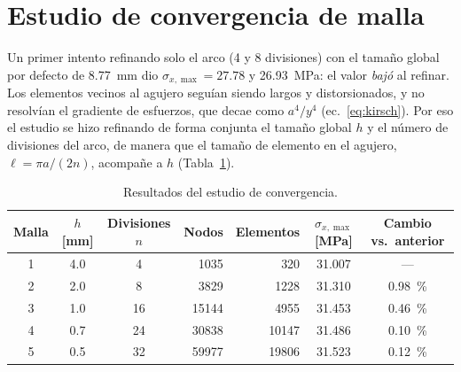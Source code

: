 \documentclass[11pt,letterpaper]{article}
\begin{document}
\section{Estudio de convergencia de malla}
Un primer intento refinando solo el arco (4 y 8 divisiones) con el tamaño global por defecto de \SI{8.77}{mm} dio $\sigma_{x,\max}=27.78$ y \SI{26.93}{MPa}: el valor \emph{bajó} al refinar. Los elementos vecinos al agujero seguían siendo largos y distorsionados, y no resolvían el gradiente de esfuerzos, que decae como $a^4/y^4$ (ec.~\ref{eq:kirsch}). Por eso el estudio se hizo refinando de forma conjunta el tamaño global $h$ y el número de divisiones del arco, de manera que el tamaño de elemento en el agujero, $\ell=\pi a/(2n)$, acompañe a $h$ (Tabla~\ref{tab:conv}).

\begin{table}[h]
\centering
\caption{Resultados del estudio de convergencia.}
\label{tab:conv}
\begin{tabular}{cccrrcc}\toprule
Malla & $h$ [mm] & Divisiones $n$ & Nodos & Elementos & $\sigma_{x,\max}$ [MPa] & Cambio vs.\ anterior\\\midrule
1 & 4.0 & 4  & \num{1035}  & \num{320}   & 31.007 & ---\\
2 & 2.0 & 8  & \num{3829}  & \num{1228}  & 31.310 & \SI{+0.98}{\%}\\
3 & 1.0 & 16 & \num{15144} & \num{4955}  & 31.453 & \SI{+0.46}{\%}\\
4 & 0.7 & 24 & \num{30838} & \num{10147} & 31.486 & \SI{+0.10}{\%}\\
5 & 0.5 & 32 & \num{59977} & \num{19806} & 31.523 & \SI{+0.12}{\%}\\\bottomrule
\end{tabular}
\end{table}
\end{document}
